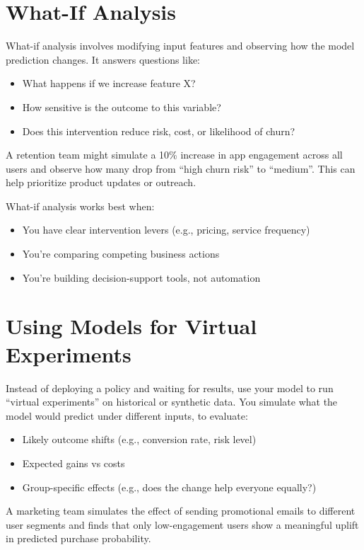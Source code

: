 \documentclass[12pt,openany]{book}
\begin{document}
\section{What-If Analysis}

What-if analysis involves modifying input features and observing how the model prediction changes. It answers questions like:
\begin{itemize}
  \item What happens if we increase feature X?
  \item How sensitive is the outcome to this variable?
  \item Does this intervention reduce risk, cost, or likelihood of churn?
\end{itemize}

\begin{examplebox}
A retention team might simulate a 10\% increase in app engagement across all users and observe how many drop from ``high churn risk'' to ``medium''. This can help prioritize product updates or outreach.
\end{examplebox}

What-if analysis works best when:
\begin{itemize}
  \item You have clear intervention levers (e.g., pricing, service frequency)
  \item You're comparing competing business actions
  \item You're building decision-support tools, not automation
\end{itemize}

\section{Using Models for Virtual Experiments}

Instead of deploying a policy and waiting for results, use your model to run “virtual experiments” on historical or synthetic data. You simulate what the model would predict under different inputs, to evaluate:
\begin{itemize}
  \item Likely outcome shifts (e.g., conversion rate, risk level)
  \item Expected gains vs costs
  \item Group-specific effects (e.g., does the change help everyone equally?)
\end{itemize}

\begin{examplebox}
A marketing team simulates the effect of sending promotional emails to different user segments and finds that only low-engagement users show a meaningful uplift in predicted purchase probability.
\end{examplebox}
\end{document}
